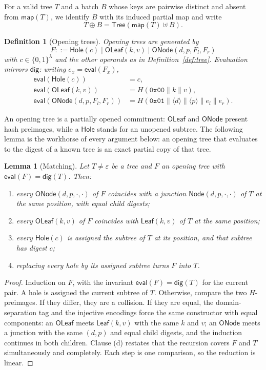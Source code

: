 \documentclass[twocolumn]{article}
\newtheorem{definition}{Definition}
\newtheorem{lemma}{Lemma}
\begin{document}
For a valid tree $T$ and a batch $B$ whose keys are pairwise distinct and absent from $\mathsf{map}(T)$, we identify $B$ with its induced partial map and write
\[
  T \oplus B = \mathsf{Tree}(\mathsf{map}(T) \uplus B).
\]

\begin{definition}[Opening trees]
\label{def:opening}
Opening trees are generated by
\[ F ::= \mathsf{Hole}(c) \mid \mathsf{OLeaf}(k, v) \mid \mathsf{ONode}(d, p, F_l, F_r) \]
with $c \in \{0,1\}^{\lambda}$ and the other operands as in Definition~\ref{def:tree}. Evaluation mirrors $\mathsf{dig}$: writing $e_x = \mathsf{eval}(F_x)$,
\begin{align*}
\mathsf{eval}(\mathsf{Hole}(c)) &= c,\\
\mathsf{eval}(\mathsf{OLeaf}(k,v)) &= H(\texttt{0x00} \| k \| v),\\
\mathsf{eval}(\mathsf{ONode}(d,p,F_l,F_r)) &= H(\texttt{0x01} \| \langle d\rangle \| \langle p\rangle \| e_l \| e_r).
\end{align*}
\end{definition}

An opening tree is a partially opened commitment: $\mathsf{OLeaf}$ and $\mathsf{ONode}$ present hash preimages, while a $\mathsf{Hole}$ stands for an unopened subtree. The following lemma is the workhorse of every argument below: an opening tree that evaluates to the digest of a known tree is an exact partial copy of that tree.

\begin{lemma}[Matching]
\label{lem:match}
Let $T \neq \varepsilon$ be a tree and $F$ an opening tree with $\mathsf{eval}(F) = \mathsf{dig}(T)$. Then:
\begin{enumerate}[nosep,label=(\alph*)]
  \item every $\mathsf{ONode}(d,p,\cdot,\cdot)$ of $F$ coincides with a junction $\mathsf{Node}(d,p,\cdot,\cdot)$ of $T$ at the same position, with equal child digests;
  \item every $\mathsf{OLeaf}(k,v)$ of $F$ coincides with $\mathsf{Leaf}(k,v)$ of $T$ at the same position;
  \item every $\mathsf{Hole}(c)$ is \emph{assigned} the subtree of $T$ at its position, and that subtree has digest $c$;
  \item replacing every hole by its assigned subtree turns $F$ into $T$.
\end{enumerate}
\end{lemma}
\begin{proof}
Induction on $F$, with the invariant $\mathsf{eval}(F) = \mathsf{dig}(T)$ for the current pair. A hole is assigned the current subtree of $T$. Otherwise, compare the two $H$-preimages. If they differ, they are a collision. If they are equal, the domain-separation tag and the injective encodings force the same constructor with equal components: an $\mathsf{OLeaf}$ meets $\mathsf{Leaf}(k,v)$ with the same $k$ and $v$; an $\mathsf{ONode}$ meets a junction with the same $(d,p)$ and equal child digests, and the induction continues in both children. Clause (d) restates that the recursion covers $F$ and $T$ simultaneously and completely. Each step is one comparison, so the reduction is linear.
\end{proof}
\end{document}
